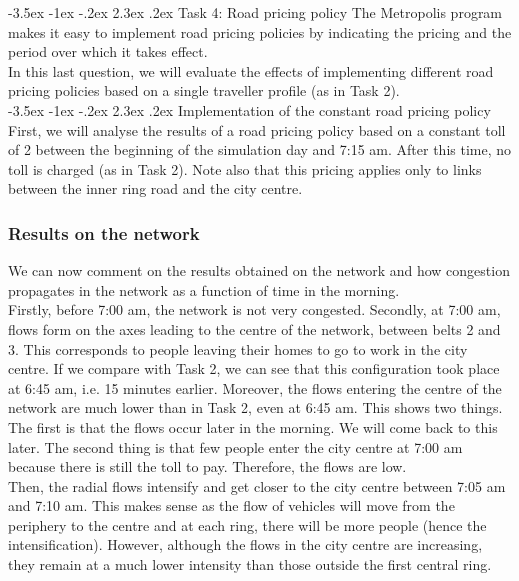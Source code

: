 \documentclass[a4paper, 12pt,oneside]{article}
\makeatletter
\renewcommand{\section}{\@startsection {section}{1}{\z@}%
             {-3.5ex \@plus -1ex \@minus -.2ex}%
             {2.3ex \@plus.2ex}%
             {\normalfont\normalsize\bfseries}}
\renewcommand{\subsection}{\@startsection {subsection}{1}{\z@}%
             {-3.5ex \@plus -1ex \@minus -.2ex}%
             {2.3ex \@plus.2ex}%
             {\normalfont\normalsize\bfseries}}
\makeatother
\begin{document}
\section{Task 4: Road pricing policy}
The Metropolis program makes it easy to implement road pricing policies by indicating the pricing and the period over which it takes effect.\\

In this last question, we will evaluate the effects of implementing different road pricing policies based on a single traveller profile (as in Task 2).\\

\subsection{Implementation of the constant road pricing policy}
First, we will analyse the results of a road pricing policy based on a constant toll of 2 between the beginning of the simulation day and 7:15 am. After this time, no toll is charged (as in Task 2). Note also that this pricing applies only to links between the inner ring road and the city centre.

\subsubsection{Results on the network}

We can now comment on the results obtained on the network and how congestion propagates in the network as a function of time in the morning.\\

Firstly, before 7:00 am, the network is not very congested. Secondly, at 7:00 am, flows form on the axes leading to the centre of the network, between belts 2 and 3. This corresponds to people leaving their homes to go to work in the city centre. If we compare with Task 2, we can see that this configuration took place at 6:45 am, i.e. 15 minutes earlier. Moreover, the flows entering the centre of the network are much lower than in Task 2, even at 6:45 am. This shows two things. The first is that the flows occur later in the morning. We will come back to this later. The second thing is that few people enter the city centre at 7:00 am because there is still the toll to pay. Therefore, the flows are low.\\

Then, the radial flows intensify and get closer to the city centre between 7:05 am and 7:10 am. This makes sense as the flow of vehicles will move from the periphery to the centre and at each ring, there will be more people (hence the intensification). However, although the flows in the city centre are increasing, they remain at a much lower intensity than those outside the first central ring.\\
\end{document}
